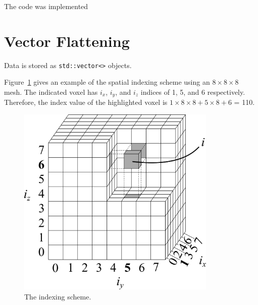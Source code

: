 


The code was implemented

\section{Vector Flattening}

Data is stored as \texttt{std::vector<>} objects.

Figure~\ref{fig:indx_ex} gives an example of the spatial indexing scheme using an $8 \times 8 \times 8$ mesh. The indicated voxel has $i_x$, $i_y$, and $i_z$ indices of 1, 5, and 6 respectively. Therefore, the index value of the highlighted voxel is $1 \times 8 \times 8 + 5 \times 8 + 6$ = 110.

\begin{figure}[tb]
  \begin{center}
   \includegraphics[width=3.75in]{figs/indx_ex}
  \end{center}
  \caption{The indexing scheme.}
\label{fig:indx_ex}
\end{figure}%

